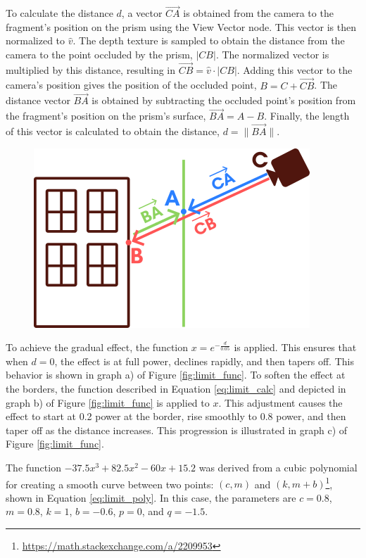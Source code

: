         To calculate the distance \( d \), a vector \(\vec{CA}\) is obtained from the camera to the fragment's position on the prism using the View Vector node. This vector is then normalized to \(\hat{v}\). The depth texture is sampled to obtain the distance from the camera to the point occluded by the prism, \(|CB|\). The normalized vector is multiplied by this distance, resulting in \(\vec{CB} = \hat{v} \cdot |CB|\). Adding this vector to the camera's position gives the position of the occluded point, \( B = C + \vec{CB} \). The distance vector \(\vec{BA}\) is obtained by subtracting the occluded point's position from the fragment's position on the prism's surface, \(\vec{BA} = A - B\). Finally, the length of this vector is calculated to obtain the distance, \( d = \|\vec{BA}\| \).
        
        \begin{figure}[h!]
            \centering
            \includegraphics[width=.5\textwidth]{figures/limit_calc.png}
            \label{fig:limit_calc}
        \end{figure}
    
        To achieve the gradual effect, the function \( x = e^{-\frac{d}{0.05}} \) is applied. This ensures that when \( d = 0 \), the effect is at full power, declines rapidly, and then tapers off. This behavior is shown in graph a) of Figure \ref{fig:limit_func}. To soften the effect at the borders, the function described in Equation \ref{eq:limit_calc} and depicted in graph b) of Figure \ref{fig:limit_func} is applied to \( x \). This adjustment causes the effect to start at 0.2 power at the border, rise smoothly to 0.8 power, and then taper off as the distance increases. This progression is illustrated in graph c) of Figure \ref{fig:limit_func}.

        The function \( -37.5 x^3 + 82.5 x^2 - 60 x + 15.2 \) was derived from a cubic polynomial for creating a smooth curve between two points: \((c, m)\) and \((k, m + b)\)\footnote{\url{https://math.stackexchange.com/a/2209953}}, shown in Equation \ref{eq:limit_poly}. In this case, the parameters are \( c = 0.8 \), \( m = 0.8 \), \( k = 1 \), \( b = -0.6 \), \( p = 0 \), and \( q = -1.5 \).

